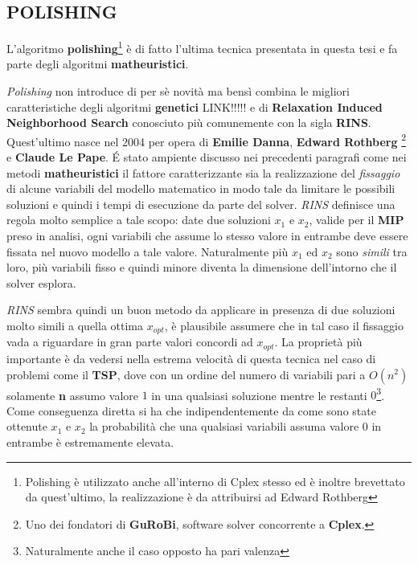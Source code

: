\documentclass[11pt]{article}
\begin{document}
\subsection*{POLISHING}
\label{sec:polishingS}

L'algoritmo \textbf{polishing}\footnote{Polishing è utilizzato anche all'interno di Cplex stesso ed è inoltre brevettato da quest'ultimo, la realizzazione è da attribuirsi ad Edward Rothberg} è di fatto l'ultima tecnica presentata in questa tesi e fa parte degli algoritmi \textbf{matheuristici}.

\textit{Polishing} non introduce di per sè novità ma bensì combina le migliori caratteristiche degli algoritmi \textbf{genetici} LINK!!!!! e di \textbf{Relaxation Induced Neighborhood Search} conosciuto più comunemente con la sigla \textbf{RINS}. Quest'ultimo nasce nel 2004 per opera di \textbf{Emilie Danna}, \textbf{Edward Rothberg} \footnote{Uno dei fondatori di \textbf{GuRoBi}, software solver concorrente a \textbf{Cplex}.} e \textbf{Claude Le Pape}. \'E stato ampiente discusso nei precedenti paragrafi come nei metodi \textbf{matheuristici} il fattore caratterizzante sia la realizzazione del \textit{fissaggio} di alcune variabili del modello matematico in modo tale da limitare le possibili soluzioni e quindi i tempi di esecuzione da parte del solver. \textit{RINS} definisce una regola molto semplice a tale scopo: date due soluzioni $x_1$ e $x_2$, valide per il \textbf{MIP} preso in analisi, ogni variabili che assume lo stesso valore in entrambe deve essere fissata nel nuovo modello a tale valore. Naturalmente più $x_1$ ed $x_2$ sono \textit{simili} tra loro, più variabili fisso e quindi minore diventa la dimensione dell'intorno che il solver esplora.

\textit{RINS} sembra quindi un buon metodo da applicare in presenza di due soluzioni molto simili a quella ottima $x_{opt}$, è plausibile assumere che in tal caso il fissaggio vada a riguardare in gran parte valori concordi ad $x_{opt}$. La proprietà più importante è da vedersi nella estrema velocità di questa tecnica nel caso di problemi come il \textbf{TSP}, dove con un ordine del numero di variabili pari a \textbf{$O(n^2)$} solamente \textbf{n} assumo valore $1$ in una qualsiasi soluzione mentre le restanti $0$\footnote{Naturalmente anche il caso opposto ha pari valenza}. Come conseguenza diretta si ha che indipendentemente da come sono state ottenute $x_1$ e $x_2$ la probabilità che una qualsiasi variabili assuma valore $0$ in entrambe è estremamente elevata.
\end{document}
